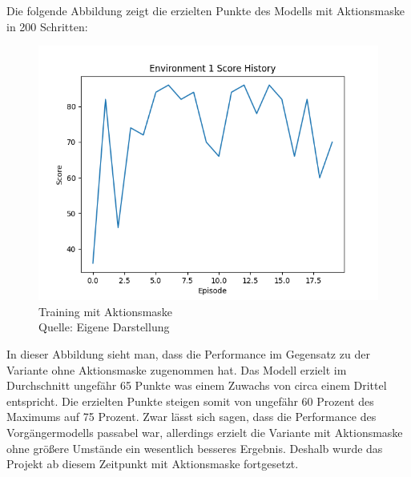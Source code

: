 Die folgende Abbildung zeigt die erzielten Punkte des Modells mit Aktionsmaske in 200 Schritten:
\nopagebreak
\begin{figure}[H]
	\includegraphics[width=1\textwidth]{Bilder/trainingwithactionmask} 
	\caption[Training mit Aktionsmaske]{Training mit Aktionsmaske\\ Quelle: Eigene Darstellung}
\end{figure}

In dieser Abbildung sieht man, dass die Performance im Gegensatz zu der Variante ohne Aktionsmaske zugenommen hat. Das Modell erzielt im Durchschnitt ungefähr 65 Punkte was einem Zuwachs von circa einem Drittel entspricht. Die erzielten Punkte steigen somit von ungefähr 60 Prozent des Maximums auf 75 Prozent. Zwar lässt sich sagen, dass die Performance des Vorgängermodells passabel war, allerdings erzielt die Variante mit Aktionsmaske ohne größere Umstände ein wesentlich besseres Ergebnis. Deshalb wurde das Projekt ab diesem Zeitpunkt mit Aktionsmaske fortgesetzt.

